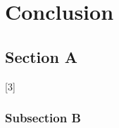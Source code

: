 \chapter{Conclusion}\label{ch:conclusion}
\blindmathtrue

\section{Section A}%
    \Blindtext
    [3]

\subsection{Subsection B}%
    \Blindtext
